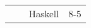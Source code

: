\documentclass[twocolumn]{article}
\begin{document}
\begin{tabular}{ | >{\bfseries}m{0.5em} | >{\bfseries}m{1em} | m{12em} | m{8em} |} \cline{1-4}
\multirow{53}{0.5em}{- \newline  \newline  \newline  \newline  \newline - \newline  \newline  \newline  \newline  \newline - \newline  \newline  \newline  \newline  \newline - \newline  \newline  \newline  \newline  \newline - \newline  \newline  \newline  \newline  \newline - \newline  \newline  \newline  \newline  \newline - \newline  \newline  \newline  \newline  \newline - \newline  \newline  \newline  \newline  \newline - \newline  \newline  \newline  \newline  \newline - \newline  \newline  \newline  \newline  \newline - \newline  \newline  \newline  \newline  \newline -} & \multirow{4}{1em}{H} & Haskell & 8-5\\ \cline{3-4}

\end{tabular}
\end{document}
